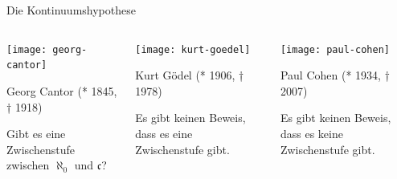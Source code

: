 \documentclass[12pt,compress,ngerman,utf8,t]{beamer}
\begin{document}
\begin{frame}{Die Kontinuumshypothese}
  \begin{columns}[t]
    \begin{column}{0.34\textwidth}
      \centering\texttt{[image: georg-cantor]} \\
      {\scriptsize Georg Cantor (* 1845, † 1918)\par}
      \bigskip

      Gibt es eine Zwischenstufe zwischen $\aleph_0$ und $\mathfrak{c}$?
    \end{column}
    \pause

    \begin{column}{0.34\textwidth}
      \centering\texttt{[image: kurt-goedel]} \\
      {\scriptsize Kurt Gödel (* 1906, † 1978)\par}
      \bigskip

      Es gibt keinen Beweis, dass es eine Zwischenstufe gibt.
    \end{column}
    \pause

    \begin{column}{0.34\textwidth}
      \centering\texttt{[image: paul-cohen]} \\
      {\scriptsize Paul Cohen (* 1934, † 2007)\par}
      \bigskip

      Es gibt keinen Beweis, dass es keine Zwischenstufe gibt.
    \end{column}
  \end{columns}
\end{frame}


\section*{}
\end{document}
